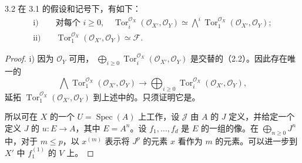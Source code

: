 \begin{SGAresult}{}{3.2}
在 3.1 的假设和记号下，有如下：
\[
\begin{aligned}
\text{i)}\quad&\text{对每个 }i\geq0,\quad
\operatorname{Tor}^{\mathcal O_X}_i(\mathcal O_{X'},\mathcal O_Y)
\simeq\bigwedge^i\operatorname{Tor}^{\mathcal O_X}_1(\mathcal O_{X'},\mathcal O_Y);\\
\text{ii)}\quad&\operatorname{Tor}^{\mathcal O_X}_1(\mathcal O_{X'},\mathcal O_Y)\simeq\mathcal F.
\end{aligned}
\]
\end{SGAresult}
\begin{proof}
i) 因为 $\mathcal O_Y$ 可用， $\bigoplus_{i\geq0}\operatorname{Tor}^{\mathcal O_X}_i(\mathcal O_{X'},\mathcal O_Y)$ 是交替的（2.2）。因此存在唯一的
\[
\bigwedge\operatorname{Tor}^{\mathcal O_X}_1(\mathcal O_{X'},\mathcal O_Y)
\longrightarrow\bigoplus_{i\geq0}\operatorname{Tor}^{\mathcal O_X}_i(\mathcal O_{X'},\mathcal O_Y),\tag{3.2.1}
\]
延拓 $\operatorname{Tor}^{\mathcal O_X}_1(\mathcal O_{X'},\mathcal O_Y)$ 到上述中的。只须证明它是。

所以可在 $X$ 的一个 $U=\operatorname{Spec}(A)$ 上工作，设 $\mathcal J$ 由 $A$ 的 $J$ 定义，并给定一个定义 $J$ 的 $u:E\to A$，其中 $E=A^n$。设 $f_1,\ldots,f_d$ 是 $E$ 的一组的像。在 $\bigoplus_{n\geq0}J^n$ 中，对于 $m\leq p$，以 $x^{(m)}$ 表示将 $J^p$ 的元素 $x$ 看作为 $m$ 的元素。可以进一步到 $X'$ 中 $f_1^{(1)}$ 的 $V$ 上。


\end{proof}
